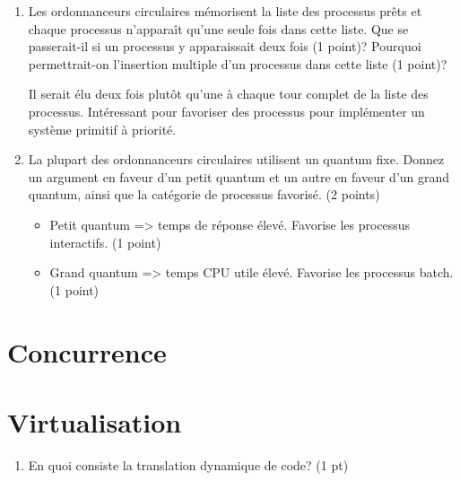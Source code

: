\begin{enumerate}
\item Les ordonnanceurs circulaires mémorisent la liste des processus prêts et chaque processus n'apparaît qu'une seule fois dans cette liste. Que se passerait-il si un processus y apparaissait deux fois (1 point)? Pourquoi permettrait-on l'insertion multiple d'un processus dans cette liste (1 point)?

\begin{correction}
Il serait élu deux fois plutôt qu'une à chaque tour complet de la liste des processus. Intéressant pour favoriser des processus pour implémenter un système primitif à priorité.
\end{correction}


\item La plupart des ordonnanceurs circulaires utilisent un quantum fixe. Donnez un argument en faveur d'un petit quantum et un autre en faveur d'un grand quantum, ainsi que la catégorie de processus favorisé. (2 points)

\begin{correction}
\begin{itemize}
  \item Petit quantum => temps de réponse élevé. Favorise les processus interactifs.  (1 point)
  \item Grand quantum => temps CPU utile élevé. Favorise les processus batch. (1 point)
\end{itemize}
\end{correction}

\end{enumerate}


\section{{Concurrence}
         {\hfill{} }}

\begin{enumerate}


\end{enumerate}



\section{{Virtualisation}
         {\hfill{} }}

\begin{enumerate}

\item En quoi consiste la translation dynamique de code? (1 pt)

\end{enumerate}


